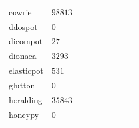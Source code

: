 \begin{table}
\begin{tabularx}{\linewidth}{l|XX|XXXXXX}
        cowrie \cite{cowire2021}                 & $98813$                               &                                          &                                 &                                    &                 &                     &                 &                     \\
        ddospot \cite{ddosspot2021}              & $0$                                   &                                          &                                 &                                    &                 &                     &                 &                     \\
        dicompot \cite{dicompot2021}             & $27$                                  &                                          &                                 &                                    &                 &                     &                 &                     \\
        dionaea \cite{dionaea2021}               & $3293$                                &                                          &                                 &                                    &                 &                     &                 &                     \\
        elasticpot \cite{elasticpot2021}         & $531$                                 &                                          &                                 &                                    &                 &                     &                 &                     \\
        glutton \cite{glutton2021}               & $0$                                   &                                          &                                 &                                    &                 &                     &                 &                     \\
        heralding \cite{heralding2021}           & $35843$                               &                                          &                                 &                                    &                 &                     &                 &                     \\
        honeypy \cite{honeysap2021}              & $0$                                   &                                          &                                 &                                    &                 &                     &                 &                     \\

\end{tabularx}
\end{table}
